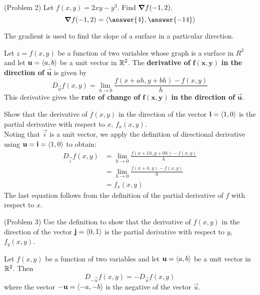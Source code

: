 \documentclass[handout]{ximera}
\begin{document}
\begin{problem}(Problem 2)
Let $f(x,y) = 2xy - y^3$.  Find $\boldsymbol\nabla f(-1, 2)$.\\
\[
\grad f(-1, 2) = \vector{\answer{4}, \answer{-14}}
\]
\end{problem}
The gradient is used to find the slope of a surface in a particular direction.

\begin{definition}
Let $z = f(x,y)$ be a function of two variables whose graph is a surface in $R^3$ and let $\mathbf u = \left\langle a,b\right\rangle$ be a unit vector in $\mathbb R^2$.
The \textbf{derivative of} $\mathbf{f(x,y)}$ \textbf{in the direction of} $\mathbf{\vec u}$ is given by
\[
D_{\vec u} f(x,y) = \lim_{h \to 0} \frac{f(x + ah, y + bh) -f(x,y)}{h}
\]
This derivative gives the \textbf{rate of change of} $\mathbf{f(x,y)}$ \textbf{in the direction of} $\mathbf{\vec u}$.
\end{definition}

\begin{example}[Example 3]
Show that the derivative of $f(x,y)$ in the direction of the vector $\mathbf i = \left\langle 1,0\right\rangle$ is the 
partial derivative with respect to $x$, $f_x(x,y)$.\\
Noting that $\vec i$ is a unit vector, we apply the definition of directional 
derivative using $\mathbf u = \mathbf i = \left\langle 1,0\right\rangle$ to obtain:
\begin{align*}
D_{\vec i} f(x,y) &= \lim_{h \to 0} \frac{f(x + 1h, y + 0h) -f(x,y)}{h}\\
                  &= \lim_{h \to 0} \frac{f(x + h, y) -f(x,y)}{h}\\
                  &= f_x(x,y)
\end{align*}
The last equation follows from the definition of the partial derivative of $f$ with respect to $x$.
\end{example}

\begin{problem}(Problem 3)
Use the definition  to show that the derivative of $f(x,y)$ in the direction of 
the vector $\mathbf j = \left\langle 0,1\right\rangle$ is the partial derivative with respect to $y$, $f_y(x,y)$.
\end{problem}


\begin{proposition}
Let $f(x,y)$ be a function of two variables and let $\mathbf u = \left\langle a,b\right\rangle$ be a unit vector in $\mathbb R^2$. Then
\[
D_{-\vec u} f(x,y) = -D_{\vec u} f(x,y)
\]
where the vector $-\mathbf u = \left\langle -a, -b\right\rangle$ is the negative of the vector $\vec u$.
\end{proposition}
\end{document}
